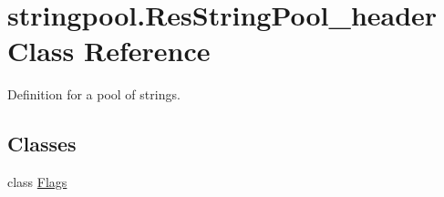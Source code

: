 \hypertarget{classstringpool_1_1ResStringPool__header}{}\section{stringpool.\+Res\+String\+Pool\+\_\+header Class Reference}
\label{classstringpool_1_1ResStringPool__header}


Definition for a pool of strings.  


\subsection*{Classes}
\begin{DoxyCompactItemize}
\item 
class \mbox{\hyperlink{classstringpool_1_1ResStringPool__header_1_1Flags}{Flags}}
\end{DoxyCompactItemize}
